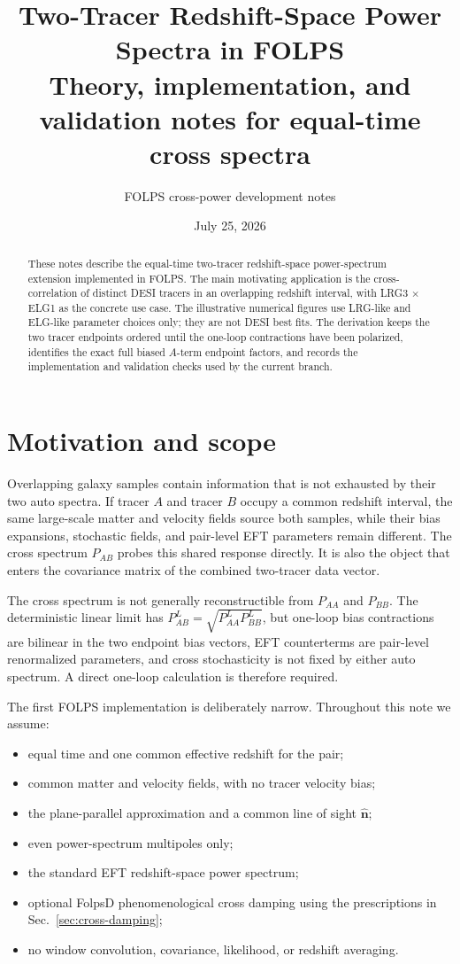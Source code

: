 \documentclass[11pt]{article}
\title{\textbf{Two-Tracer Redshift-Space Power Spectra in FOLPS}\\
\large Theory, implementation, and validation notes for equal-time cross spectra}
\author{FOLPS cross-power development notes}
\date{July 25, 2026}
\newcommand{\bn}{\hat{\bm{n}}}
\begin{document}
\maketitle

\begin{abstract}
These notes describe the equal-time two-tracer redshift-space power-spectrum
extension implemented in FOLPS.  The main motivating application is the
cross-correlation of distinct DESI tracers in an overlapping redshift interval,
with LRG3 $\times$ ELG1 as the concrete use case.  The illustrative numerical
figures use LRG-like and ELG-like parameter choices only; they are not DESI
best fits.  The derivation keeps the two tracer endpoints ordered until the
one-loop contractions have been polarized, identifies the exact full biased
$A$-term endpoint factors, and records the implementation and validation checks
used by the current branch.
\end{abstract}

\tableofcontents

\section{Motivation and scope}

Overlapping galaxy samples contain information that is not exhausted by their
two auto spectra.  If tracer $A$ and tracer $B$ occupy a common redshift
interval, the same large-scale matter and velocity fields source both samples,
while their bias expansions, stochastic fields, and pair-level EFT parameters
remain different.  The cross spectrum $P_{AB}$ probes this shared response
directly.  It is also the object that enters the covariance matrix of the
combined two-tracer data vector.

The cross spectrum is not generally reconstructible from $P_{AA}$ and
$P_{BB}$.  The deterministic linear limit has
$P_{AB}^{L}=\sqrt{P_{AA}^{L}P_{BB}^{L}}$, but one-loop bias contractions are
bilinear in the two endpoint bias vectors, EFT counterterms are pair-level
renormalized parameters, and cross stochasticity is not fixed by either auto
spectrum.  A direct one-loop calculation is therefore required.

The first FOLPS implementation is deliberately narrow.  Throughout this note we
assume:
\begin{itemize}[leftmargin=1.6em]
  \item equal time and one common effective redshift for the pair;
  \item common matter and velocity fields, with no tracer velocity bias;
  \item the plane-parallel approximation and a common line of sight $\bn$;
  \item even power-spectrum multipoles only;
  \item the standard EFT redshift-space power spectrum;
  \item optional FolpsD phenomenological cross damping using the prescriptions
        in Sec.~\ref{sec:cross-damping};
  \item no window convolution, covariance, likelihood, or redshift averaging.
\end{itemize}
\end{document}
